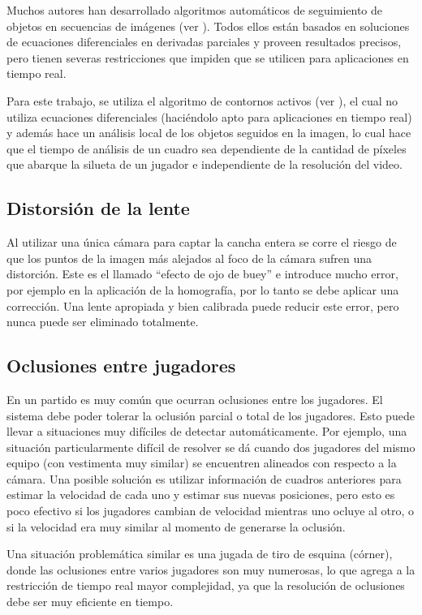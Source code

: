 Muchos autores han desarrollado algoritmos automáticos de seguimiento de
objetos en secuencias de imágenes (ver \cite{IFTrace, alp, local-learning,
MHT-2}). Todos ellos están basados en soluciones de ecuaciones diferenciales en
derivadas parciales y proveen resultados precisos, pero tienen severas
restricciones que impiden que se utilicen para aplicaciones en tiempo real.

Para este trabajo, se utiliza el algoritmo de contornos activos (ver
\cite{fast-level-set}), el cual no utiliza ecuaciones diferenciales (haciéndolo
apto para aplicaciones en tiempo real) y además hace un análisis local de los
objetos seguidos en la imagen, lo cual hace que el tiempo de análisis de un
cuadro sea dependiente de la cantidad de píxeles que abarque la silueta de un
jugador e independiente de la resolución del video.

\subsection{Distorsión de la lente}

Al utilizar una única cámara para captar la cancha entera se corre el riesgo de
que los puntos de la imagen más alejados al foco de la cámara sufren una
distorción. Este es el llamado ``efecto de ojo de buey'' e introduce mucho
error, por ejemplo en la aplicación de la homografía, por lo tanto se debe
aplicar una corrección. Una lente apropiada y bien calibrada puede reducir este
error, pero nunca puede ser eliminado totalmente.


\subsection{Oclusiones entre jugadores}

En un partido es muy común que ocurran oclusiones entre los jugadores. El
sistema debe poder tolerar la oclusión parcial o total de los jugadores. Esto
puede llevar a situaciones muy difíciles de detectar automáticamente. Por
ejemplo, una situación particularmente difícil de resolver se dá cuando dos
jugadores del mismo equipo (con vestimenta muy similar) se encuentren alineados
con respecto a la cámara. Una posible solución es utilizar información de
cuadros anteriores para estimar la velocidad de cada uno y estimar sus nuevas
posiciones, pero esto es poco efectivo si los jugadores cambian de velocidad
mientras uno ocluye al otro, o si la velocidad era muy similar al momento de
generarse la oclusión.

Una situación problemática similar es una jugada de tiro de esquina (córner),
donde las oclusiones entre varios jugadores son muy numerosas, lo que agrega a
la restricción de tiempo real mayor complejidad, ya que la resolución de
oclusiones debe ser muy eficiente en tiempo.

